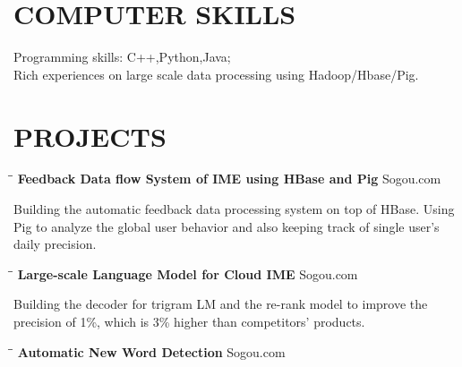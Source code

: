 \documentclass{res}
\begin{document}
\begin{resume}
\section{COMPUTER SKILLS}          
    Programming skills: C++,Python,Java;\\
    Rich experiences on large scale data processing using Hadoop/Hbase/Pig.
 
\section{PROJECTS}
   \vspace{-0.1in}	
   \begin{tabbing}
   \hspace{2.5in}\= \hspace{3in}\= \kill %
    {\bf Feedback Data flow System of IME using HBase and Pig}\> \>Sogou.com     \\
   \end{tabbing}\vspace{-20pt}      %
   Building the automatic feedback data processing system on top of HBase. Using Pig to analyze the global user behavior and also keeping track of single user's daily precision. 
   \begin{tabbing}
   \hspace{2.5in}\= \hspace{3in}\= \kill %
    {\bf Large-scale Language Model for Cloud IME} \> \>Sogou.com     \\
   \end{tabbing}\vspace{-20pt}      %
   Building the decoder for trigram LM and the re-rank model to improve the precision of 1\%, which is 3\% higher than competitors' products.
   \begin{tabbing}
   \hspace{2.5in}\= \hspace{3in}\= \kill %
    {\bf Automatic New Word Detection}\> \>Sogou.com     \\
   \end{tabbing}\vspace{-20pt}      %

\end{resume}
\end{document}
